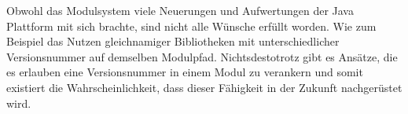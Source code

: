   Obwohl das Modulsystem viele Neuerungen und Aufwertungen der Java Plattform mit sich brachte, sind nicht alle Wünsche erfüllt worden. Wie zum Beispiel das Nutzen gleichnamiger Bibliotheken mit unterschiedlicher Versionsnummer auf demselben Modulpfad.\newline
  Nichtsdestotrotz gibt es Ansätze, die es erlauben eine Versionsnummer in einem Modul zu verankern und somit existiert die Wahrscheinlichkeit, dass dieser Fähigkeit in der Zukunft nachgerüstet wird. 
 

